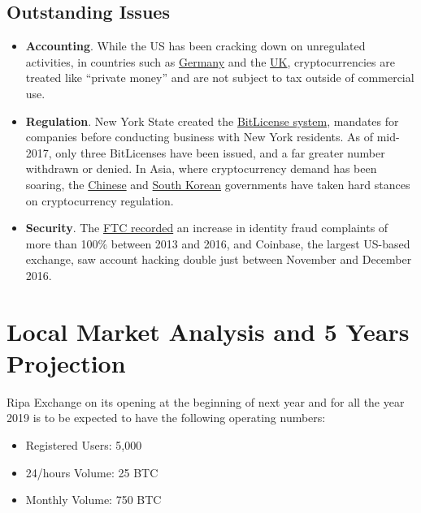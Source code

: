 \documentclass[11pt,fleqn,oneside]{book} %
\begin{document}
	\subsection{Outstanding Issues}
		\begin{itemize}
			\item \textbf{Accounting}. While the US has been cracking down on unregulated activities, in countries such as 
			\href{https://techcrunch.com/2013/08/19/germany-recognizes-bitcoin-as-private-money-sales-tax-coming-soon/}{Germany} 
			and the \href{http://www.ibtimes.co.uk/hmrc-re-classify-bitcoin-private-money-1432718}{UK}, 
			cryptocurrencies are treated like ``private money'' and are not subject to tax outside of commercial use.
			\item \textbf{Regulation}. New York State created the 
			\href{https://www.wired.com/2014/07/ny_bitcoin/}{BitLicense system}, mandates for companies 
			before conducting business with New York residents. As of mid-2017, only three BitLicenses have been issued, 
			and a far greater number withdrawn or denied. In Asia, where cryptocurrency demand has been soaring, 
			the \href{http://fortune.com/2018/01/17/china-bitcoin-cryptocurrency-crackdown/}{Chinese} 
			and \href{https://www.bloomberg.com/news/articles/2017-12-13/south-korea-seeks-measures-to-curb-frenzied-bitcoin-speculation}{South Korean} 
			governments have taken hard stances on cryptocurrency regulation.
			\item \textbf{Security}. The 
			\href{https://www.forbes.com/sites/laurashin/2016/12/20/hackers-have-stolen-millions-of-dollars-in-bitcoin-using-only-phone-numbers/#3ac0bf1d38ba}{FTC recorded} 
			an increase in identity fraud complaints of more than 100\% between 2013 and 2016, 
			and Coinbase, the largest US-based exchange, saw account hacking double just between November and December 2016.
		\end{itemize}

\section{Local Market Analysis and 5 Years Projection}
Ripa Exchange on its opening at the beginning of next year and for all the year 2019 is to be expected
to have the following operating numbers:
\begin{itemize}
	\item Registered Users: 5,000			%
	\item 24/hours Volume: 25 BTC			%
	\item Monthly Volume: 750 BTC			%
\end{itemize}
\end{document}

